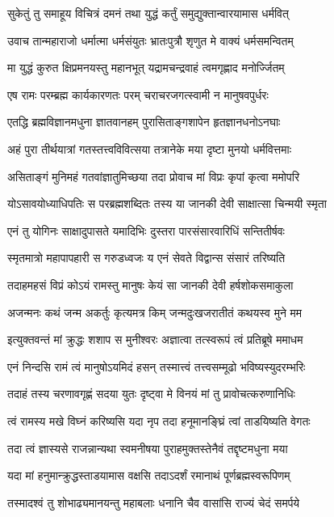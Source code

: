 \twolineshloka
{सुकेतुं तु समाहूय विचित्रं दमनं तथा}
{युद्धं कर्तुं समुद्युक्तान्वारयामास धर्मवित्}%

\twolineshloka
{उवाच तान्महाराजो धर्मात्मा धर्मसंयुतः}
{भ्रातःपुत्रौ शृणुत मे वाक्यं धर्मसमन्वितम्}%

\twolineshloka
{मा युद्धं कुरुत क्षिप्रमनयस्तु महानभूत्}
{यद्रामचन्द्रवाहं त्वमगृह्णाद मनोर्ज्जितम्}%

\twolineshloka
{एष रामः परम्ब्रह्म कार्यकारणतः परम्}
{चराचरजगत्स्वामी न मानुषवपुर्धरः}%

\twolineshloka
{एतद्धि ब्रह्मविज्ञानमधुना ज्ञातवानहम्}
{पुरासिताङ्गशापेन हृतज्ञानधनोऽनघाः}%

\twolineshloka
{अहं पुरा तीर्थयात्रां गतस्तत्त्वविवित्सया}
{तत्रानेके मया दृष्टा मुनयो धर्मवित्तमाः}%

\twolineshloka
{असिताङ्गं मुनिमहं गतवांज्ञातुमिच्छया}
{तदा प्रोवाच मां विप्रः कृपां कृत्वा ममोपरि}%

\twolineshloka
{योऽसावयोध्याधिपतिः स परब्रह्मशब्दितः}
{तस्य या जानकी देवी साक्षात्सा चिन्मयी स्मृता}%

\twolineshloka
{एनं तु योगिनः साक्षादुपासते यमादिभिः}
{दुस्तरा पारसंसारवारिधिं सन्तितीर्षवः}%

\twolineshloka
{स्मृतमात्रो महापापहारी स गरुडध्वजः}
{य एनं सेवते विद्वान्स संसारं तरिष्यति}%

\twolineshloka
{तदाहमहसं विप्रं कोऽयं रामस्तु मानुषः}
{केयं सा जानकी देवी हर्षशोकसमाकुला}%

\twolineshloka
{अजन्मनः कथं जन्म अकर्तुः कृत्यमत्र किम्}
{जन्मदुःखजरातीतं कथयस्व मुने मम}%

\twolineshloka
{इत्युक्तवन्तं मां क्रुद्धः शशाप स मुनीश्वरः}
{अज्ञात्वा तत्स्वरूपं त्वं प्रतिब्रूषे ममाधम}%

\twolineshloka
{एनं निन्दसि रामं त्वं मानुषोऽयमिदं हसन्}
{तस्मात्त्वं तत्त्वसम्मूढो भविष्यस्युदरम्भरिः}%

\twolineshloka
{तदाहं तस्य चरणावगृह्णं सदया युतः}
{दृष्ट्वा मे विनयं मां तु प्रावोचत्करुणानिधिः}%

\twolineshloka
{त्वं रामस्य मखे विघ्नं करिष्यसि यदा नृप}
{तदा हनूमानङ्घ्रिं त्वां ताडयिष्यति वेगतः}%

\twolineshloka
{तदा त्वं ज्ञास्यसे राजन्नान्यथा स्वमनीषया}
{पुराहमुक्तस्तेनैवं तद्दृष्टमधुना मया}%

\twolineshloka
{यदा मां हनुमान्क्रुद्धस्ताडयामास वक्षसि}
{तदाऽदर्शं रमानाथं पूर्णब्रह्मस्वरूपिणम्}%

\twolineshloka
{तस्मादश्वं तु शोभाढ्यमानयन्तु महाबलाः}
{धनानि चैव वासांसि राज्यं चेदं समर्पये}%


